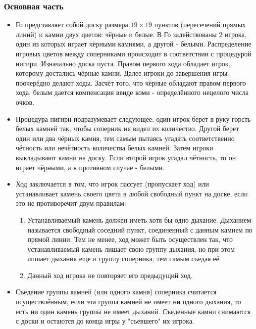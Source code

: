 \subsubsection*{Основная часть}
\begin{itemize}

\item Го представляет собой доску размера $19 \times 19$ пунктов (пересечений прямых линий) и камни двух цветов: чёрные и белые. В Го задействованы 2 игрока, один из которых играет чёрными камнями, а другой - белыми. Распределение игровых цветов между соперниками происходит в соответствии с процедурой нигири. Изначально доска пуста. Правом первого хода обладает игрок, которому достались чёрные камни. Далее игроки до завершения игры поочерёдно делают ходы. Засчёт того, что чёрные обладают правом первого хода, белым дается компенсация ввиде коми - определённого нецелого числа очков.\\

\item Процедура нигири подразумевает следующее: один игрок берет в руку горсть белых камней так, чтобы соперник не видел их количество. Другой берет один или два чёрных камня, тем самым пытаясь угадать соответственно чётность или нечётность количества белых камней. Затем игроки выкладывают камни на доску. Если второй игрок угадал чётность, то он играет чёрными, а в противном случае - белыми.\\

\item Ход заключается в том, что игрок пассует (пропускает ход) или устанавливает камень своего цвета в любой свободный пункт на доске, если это не противоречит двум правилам:
  \begin{enumerate}
  
  \item Устанавливаемый камень должен иметь хотя бы одно дыхание. Дыханием называется свободный соседний пункт, соединенный с данным камнем по прямой линии. Тем не менее, ход может быть осуществлен так, что устанавливаемый камень лишает свою группу дыхания, но при этом лишает дыхания еще и группу соперника, тем самым съедая её.\\
 
  \item  Данный ход игрока не повторяет его предыдущий ход.\\
  
  \end{enumerate}

\item Съедение группы камней (или одного камня) соперника считается осуществлённым, если эта группа камней не имеет
    ни одного дыхания, то есть ни один камень группы не имеет дыханий. Съеденные камни снимаются с доски и остаются до
    конца игры у "съевшего" их игрока.\\
    

\end{itemize}
